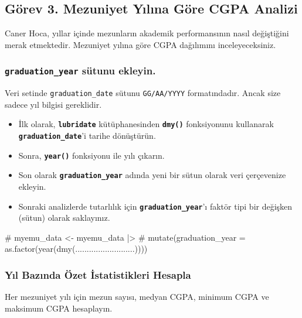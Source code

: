 \documentclass[
  11pt,
  a4paper,
  DIV=11,
  numbers=noendperiod]{scrartcl}
\newenvironment{Shaded}{\begin{snugshade}}{\end{snugshade}}
\newcommand{\CommentTok}[1]{\textcolor[rgb]{0.37,0.37,0.37}{#1}}
\begin{document}
\subsection{Görev 3. Mezuniyet Yılına Göre CGPA
Analizi}\label{guxf6rev-3.-mezuniyet-yux131lux131na-guxf6re-cgpa-analizi}

Caner Hoca, yıllar içinde mezunların akademik performansının nasıl
değiştiğini merak etmektedir. Mezuniyet yılına göre CGPA dağılımını
inceleyeceksiniz.

\subsubsection{\texorpdfstring{\texttt{graduation\_year} sütunu
ekleyin.}{graduation\_year sütunu ekleyin.}}\label{graduation_year-suxfctunu-ekleyin.}

Veri setinde \texttt{graduation\_date} sütunu \texttt{GG/AA/YYYY}
formatındadır. Ancak size sadece yıl bilgisi gereklidir.

\begin{itemize}
\item
  İlk olarak, \textbf{\texttt{lubridate}} kütüphanesinden
  \textbf{\texttt{dmy()}} fonksiyonunu kullanarak
  \textbf{\texttt{graduation\_date}}'i tarihe dönüştürün.
\item
  Sonra, \textbf{\texttt{year()}} fonksiyonu ile yılı çıkarın.
\item
  Son olarak \textbf{\texttt{graduation\_year}} adında yeni bir sütun
  olarak veri çerçevenize ekleyin.
\item
  Sonraki analizlerde tutarlılık için
  \textbf{\texttt{graduation\_year}}'ı faktör tipi bir değişken (sütun)
  olarak saklayınız.
\end{itemize}

\begin{Shaded}
\begin{Highlighting}[]
\CommentTok{\# myemu\_data \textless{}{-} myemu\_data |\textgreater{}}
\CommentTok{\#   mutate(graduation\_year = as.factor(year(dmy(..........................))))}
\end{Highlighting}
\end{Shaded}

\subsubsection{Yıl Bazında Özet İstatistikleri
Hesapla}\label{yux131l-bazux131nda-uxf6zet-istatistikleri-hesapla}

Her mezuniyet yılı için mezun sayısı, medyan CGPA, minimum CGPA ve
maksimum CGPA hesaplayın.
\end{document}
